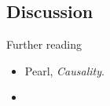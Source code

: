   \subsection{Discussion}
  \begin{frame}
    \begin{block}{Further reading}
      \begin{itemize}
      \item Pearl, \emph{Causality}.
      \item \citet{dawid2012decision}
      \end{itemize}
    \end{block}
  \end{frame}
